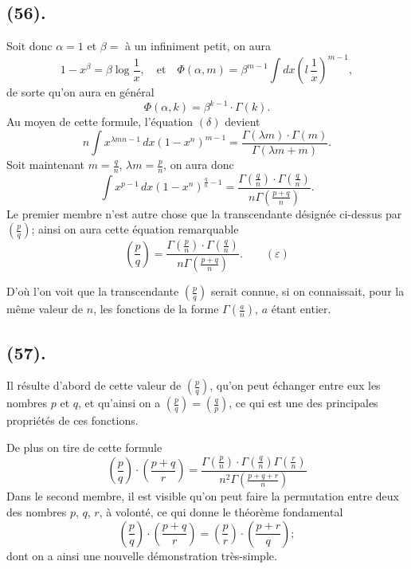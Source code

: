 \documentclass{article}
\begin{document}
\subsection*{(56).}

Soit donc $\alpha=1$ et $\beta=$ à un infiniment petit, on aura
\[ 1-x^{\beta}=\beta\log\frac{1}{x},\quad\text{et}\quad\Phi(\alpha,m)=\beta^{m-1}\int dx\left(l\,\frac{1}{x}\right)^{m-1}, \]
de sorte qu'on aura en général
\[ \Phi(\alpha,k)=\beta^{k-1}\cdot\Gamma(k). \]
Au moyen de cette formule, l'équation $(\delta)$ devient
\[ n\int x^{\lambda mn-1}\,dx(1-x^{n})^{m-1}=\frac{\Gamma(\lambda m)\cdot\Gamma(m)}{\Gamma(\lambda m+m)}. \]
Soit maintenant $m=\frac{q}{n}$, $\lambda m=\frac{p}{n}$, on aura donc
\[ \int x^{p-1}\,dx(1-x^{n})^{\frac{q}{n}-1}=\frac{\Gamma\left(\frac{q}{n}\right)\cdot\Gamma\left(\frac{q}{n}\right)}{n\Gamma\left(\frac{p+q}{n}\right)}. \]
Le premier membre n'est autre chose que la transcendante désignée ci-dessus par $\left(\frac{p}{q}\right)$; ainsi on aura cette équation remarquable
\[ \left(\frac{p}{q}\right)=\frac{\Gamma\left(\frac{p}{n}\right)\cdot\Gamma\left(\frac{q}{n}\right)}{n\Gamma\left(\frac{p+q}{n}\right)}.\qquad(\varepsilon) \]

D'où l'on voit que la transcendante $\left(\frac{p}{q}\right)$ serait connue, si on connaissait, pour la même valeur de $n$, les fonctions de la forme $\Gamma\left(\frac{a}{n}\right)$, $a$ étant entier.

\subsection*{(57).}

Il résulte d'abord de cette valeur de $\left(\frac{p}{q}\right)$, qu'on peut échanger entre eux les nombres $p$ et $q$, et qu'ainsi on a $\left(\frac{p}{q}\right)=\left(\frac{q}{p}\right)$, ce qui est une des principales propriétés de ces fonctions.

De plus on tire de cette formule
\[ \left(\frac{p}{q}\right)\cdot\left(\frac{p+q}{r}\right)=\frac{\Gamma\left(\frac{p}{n}\right)\cdot\Gamma\left(\frac{q}{n}\right)\Gamma\left(\frac{r}{n}\right)}{n^{2}\Gamma\left(\frac{p+q+r}{n}\right)} \]
Dans le second membre, il est visible qu'on peut faire la permutation entre deux des nombres $p$, $q$, $r$, à volonté, ce qui donne le théorème fondamental
\[ \left(\frac{p}{q}\right)\cdot\left(\frac{p+q}{r}\right)=\left(\frac{p}{r}\right)\cdot\left(\frac{p+r}{q}\right); \]
dont on a ainsi une nouvelle démonstration très-simple.
\end{document}
